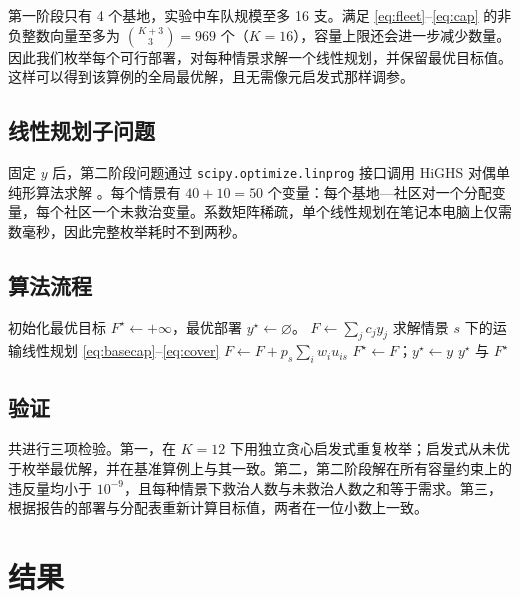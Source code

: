 \documentclass[12pt,a4paper,fontset=windows]{ctexart}
\begin{document}
第一阶段只有 4 个基地，实验中车队规模至多 16 支。满足 \eqref{eq:fleet}--\eqref{eq:cap} 的非负整数向量至多为 $\binom{K+3}{3}=969$ 个（$K=16$），容量上限还会进一步减少数量。因此我们枚举每个可行部署，对每种情景求解一个线性规划，并保留最优目标值。这样可以得到该算例的全局最优解，且无需像元启发式那样调参。

\subsection{线性规划子问题}

固定 $y$ 后，第二阶段问题通过 \texttt{scipy.optimize.linprog} 接口调用 HiGHS 对偶单纯形算法求解 \cite{virtanen2020}。每个情景有 $40+10=50$ 个变量：每个基地—社区对一个分配变量，每个社区一个未救治变量。系数矩阵稀疏，单个线性规划在笔记本电脑上仅需数毫秒，因此完整枚举耗时不到两秒。

\subsection{算法流程}

\begin{algorithm}[H]
\caption{两阶段模型的精确求解}
\label{alg:enum}
\begin{algorithmic}[1]
\State 初始化最优目标 $F^{\star}\gets +\infty$，最优部署 $y^{\star}\gets \varnothing$。
  \State $F\gets \sum_j c_j y_j$
    \State 求解情景 $s$ 下的运输线性规划 \eqref{eq:basecap}--\eqref{eq:cover}
    \State $F\gets F + p_s \sum_i w_i u_{is}$
  \EndFor
    \State $F^{\star}\gets F$；\quad $y^{\star}\gets y$
  \EndIf
\EndFor
\State \Return $y^{\star}$ 与 $F^{\star}$
\end{algorithmic}
\end{algorithm}

\subsection{验证}

共进行三项检验。第一，在 $K=12$ 下用独立贪心启发式重复枚举；启发式从未优于枚举最优解，并在基准算例上与其一致。第二，第二阶段解在所有容量约束上的违反量均小于 $10^{-9}$，且每种情景下救治人数与未救治人数之和等于需求。第三，根据报告的部署与分配表重新计算目标值，两者在一位小数上一致。

\section{结果}
\end{document}
